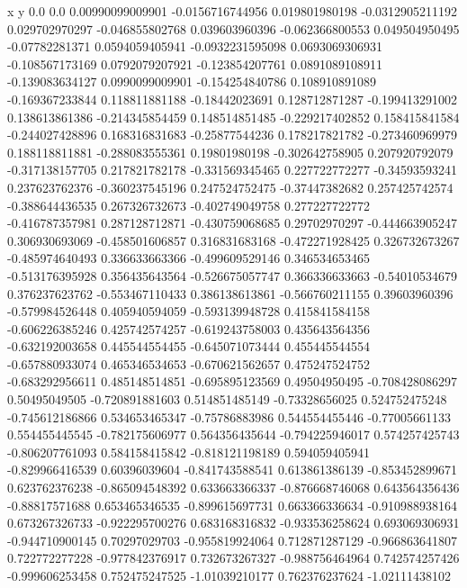               x                y
            0.0              0.0
0.00990099009901  -0.0156716744956
 0.019801980198  -0.0312905211192
 0.029702970297  -0.046855802768
 0.039603960396  -0.062366800553
 0.049504950495   -0.07782281371
0.0594059405941  -0.0932231595098
0.0693069306931  -0.108567173169
0.0792079207921  -0.123854207761
0.0891089108911  -0.139083634127
0.0990099009901  -0.154254840786
 0.108910891089  -0.169367233844
 0.118811881188   -0.18442023691
 0.128712871287  -0.199413291002
 0.138613861386  -0.214345854459
 0.148514851485  -0.229217402852
 0.158415841584  -0.244027428896
 0.168316831683   -0.25877544236
 0.178217821782  -0.273460969979
 0.188118811881  -0.288083555361
  0.19801980198  -0.302642758905
 0.207920792079  -0.317138157705
 0.217821782178  -0.331569345465
 0.227722772277   -0.34593593241
 0.237623762376  -0.360237545196
 0.247524752475   -0.37447382682
 0.257425742574  -0.388644436535
 0.267326732673  -0.402749049758
 0.277227722772  -0.416787357981
 0.287128712871  -0.430759068685
  0.29702970297  -0.444663905247
 0.306930693069  -0.458501606857
 0.316831683168  -0.472271928425
 0.326732673267  -0.485974640493
 0.336633663366  -0.499609529146
 0.346534653465  -0.513176395928
 0.356435643564  -0.526675057747
 0.366336633663   -0.54010534679
 0.376237623762  -0.553467110433
 0.386138613861  -0.566760211155
  0.39603960396  -0.579984526448
 0.405940594059  -0.593139948728
 0.415841584158  -0.606226385246
 0.425742574257  -0.619243758003
 0.435643564356  -0.632192003658
 0.445544554455  -0.645071073444
 0.455445544554  -0.657880933074
 0.465346534653  -0.670621562657
 0.475247524752  -0.683292956611
 0.485148514851  -0.695895123569
  0.49504950495  -0.708428086297
  0.50495049505  -0.720891881603
 0.514851485149   -0.73328656025
 0.524752475248  -0.745612186866
 0.534653465347   -0.75786883986
 0.544554455446   -0.77005661133
 0.554455445545  -0.782175606977
 0.564356435644  -0.794225946017
 0.574257425743  -0.806207761093
 0.584158415842  -0.818121198189
 0.594059405941  -0.829966416539
  0.60396039604  -0.841743588541
 0.613861386139  -0.853452899671
 0.623762376238  -0.865094548392
 0.633663366337  -0.876668746068
 0.643564356436   -0.88817571688
 0.653465346535  -0.899615697731
 0.663366336634  -0.910988938164
 0.673267326733  -0.922295700276
 0.683168316832  -0.933536258624
 0.693069306931  -0.944710900145
  0.70297029703  -0.955819924064
 0.712871287129  -0.966863641807
 0.722772277228  -0.977842376917
 0.732673267327  -0.988756464964
 0.742574257426  -0.999606253458
 0.752475247525   -1.01039210177
 0.762376237624   -1.02111438102
